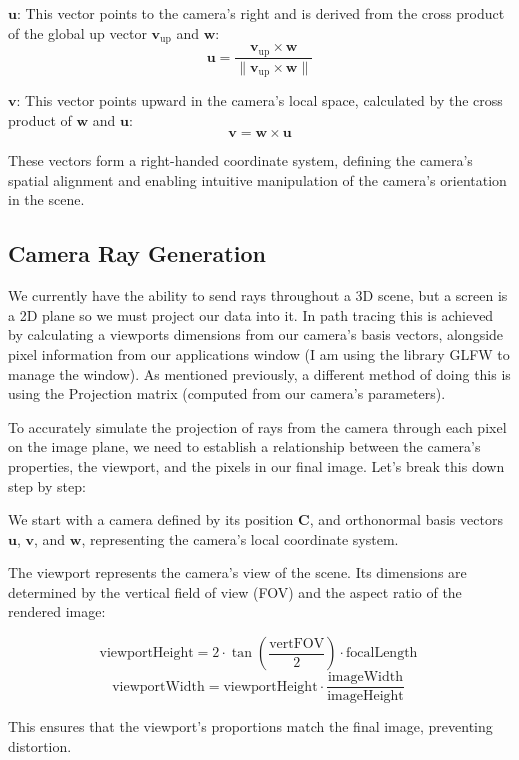 \documentclass[12pt]{article}
\begin{document}
\(\mathbf{u}\): This vector points to the camera's right and is derived from the cross product of the global up vector \(\mathbf{v}_{\text{up}}\) and \(\mathbf{w}\):
\[
    \mathbf{u} = \frac{\mathbf{v}_{\text{up}} \times \mathbf{w}}{\|\mathbf{v}_{\text{up}} \times \mathbf{w}\|}
\]

\(\mathbf{v}\): This vector points upward in the camera's local space, calculated by the cross product of \(\mathbf{w}\) and \(\mathbf{u}\):
\[
    \mathbf{v} = \mathbf{w} \times \mathbf{u}
\]

These vectors form a right-handed coordinate system, defining the camera's spatial alignment and enabling intuitive manipulation of the camera's orientation in the scene.

\subsection{Camera Ray Generation}
We currently have the ability to send rays throughout a 3D scene, but a screen is a 2D plane so we must project our data into it. In path tracing this is achieved by calculating a viewports dimensions from our camera's basis vectors, alongside pixel information from our applications window (I am using the library GLFW to manage the window). As mentioned previously, a different method of doing this is using the Projection matrix (computed from our camera's parameters).

To accurately simulate the projection of rays from the camera through each pixel on the image plane, we need to establish a relationship between the camera's properties, the viewport, and the pixels in our final image. Let's break this down step by step:

We start with a camera defined by its position $\mathbf{C}$, and orthonormal basis vectors $\mathbf{u}$, $\mathbf{v}$, and $\mathbf{w}$, representing the camera's local coordinate system.

The viewport represents the camera's view of the scene. Its dimensions are determined by the vertical field of view (FOV) and the aspect ratio of the rendered image:

$$ \text{viewportHeight} = 2 \cdot \tan\left(\frac{\text{vertFOV}}{2}\right) \cdot \text{focalLength}
    \ $$
$$ \text{viewportWidth} = \text{viewportHeight} \cdot \frac{\text{imageWidth}}{\text{imageHeight}}
    \ $$

This ensures that the viewport's proportions match the final image, preventing distortion.
\end{document}
